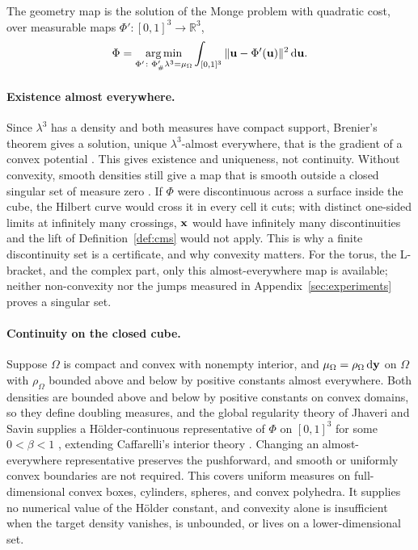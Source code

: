 The geometry map is the solution of the Monge problem with quadratic cost, over measurable maps $\Phi'\colon[0,1]^3\to\mathbb R^3$,
\begin{equation}
  \label{eq:vsfc-monge}
  \Phi=\operatorname*{arg\,min}_{\Phi'\colon\Phi'_\#\lambda^3=\mu_\Omega}\int_{[0,1]^3}\|{\bm{\mathrm{u}}}-\Phi'({\bm{\mathrm{u}}})\|^2\,\mathrm{d}{\bm{\mathrm{u}}}.
\end{equation}
\paragraph{Existence almost everywhere.}
Since $\lambda^3$ has a density and both measures have compact support, Brenier's theorem gives a solution, unique $\lambda^3$-almost everywhere, that is the gradient of a convex potential \cite{brenier1991,peyre2019computational}. This gives existence and uniqueness, not continuity. Without convexity, smooth densities still give a map that is smooth outside a closed singular set of measure zero \cite{dephilippis2015}. If $\Phi$ were discontinuous across a surface inside the cube, the Hilbert curve would cross it in every cell it cuts; with distinct one-sided limits at infinitely many crossings, ${\bm{\mathrm{x}}}$ would have infinitely many discontinuities and the lift of Definition~\ref{def:cms} would not apply. This is why a finite discontinuity set is a certificate, and why convexity matters. For the torus, the L-bracket, and the complex part, only this almost-everywhere map is available; neither non-convexity nor the jumps measured in Appendix~\ref{sec:experiments} proves a singular set.

\paragraph{Continuity on the closed cube.}
Suppose $\Omega$ is compact and convex with nonempty interior, and $\mu_\Omega=\rho_\Omega\,\mathrm{d}{\bm{\mathrm{y}}}$ on $\Omega$ with $\rho_\Omega$ bounded above and below by positive constants almost everywhere. Both densities are bounded above and below by positive constants on convex domains, so they define doubling measures, and the global regularity theory of Jhaveri and Savin supplies a H\"older-continuous representative of $\Phi$ on $[0,1]^3$ for some $0<\beta<1$ \cite[Theorem~1.1, Corollary~2.5, and Lemma~2.6]{jhaveri2022regularity}, extending Caffarelli's interior theory \cite{caffarelli1992}. Changing an almost-everywhere representative preserves the pushforward, and smooth or uniformly convex boundaries are not required. This covers uniform measures on full-dimensional convex boxes, cylinders, spheres, and convex polyhedra. It supplies no numerical value of the H\"older constant, and convexity alone is insufficient when the target density vanishes, is unbounded, or lives on a lower-dimensional set.


